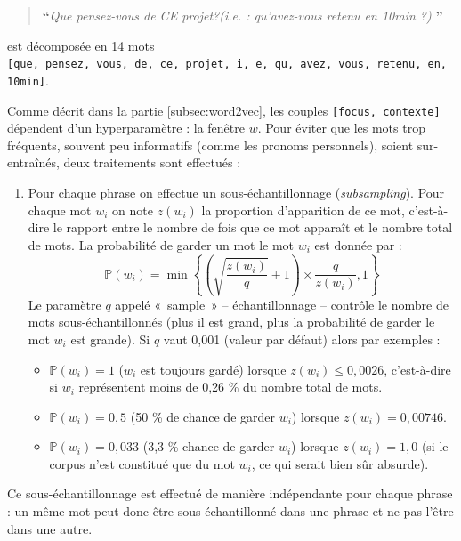 \documentclass[11pt,french,french]{article}
\providecommand{\tightlist}{%
  \setlength{\parskip}{0pt}
  }
\begin{document}
\begin{quote}
\LARGE \textbf{``}\normalsize \emph{Que pensez-vous de CE projet?(i.e. : qu'avez-vous retenu en 10min ?)} \LARGE \textbf{''}\normalsize
\end{quote}

est décomposée en 14 mots
\texttt{{[}que,\ pensez,\ vous,\ de,\ ce,\ projet,\ i,\ e,\ qu,\ avez,\ vous,\ retenu,\ en,\ 10min{]}}.

Comme décrit dans la partie \ref{subsec:word2vec}, les couples
\texttt{{[}focus,\ contexte{]}} dépendent d'un hyperparamètre : la
fenêtre \(w\). Pour éviter que les mots trop fréquents, souvent peu
informatifs (comme les pronoms personnels), soient sur-entraînés, deux
traitements sont effectués :

\begin{enumerate}
\def\labelenumi{\arabic{enumi}.}
\item
  Pour chaque phrase on effectue un sous-échantillonnage
  (\emph{subsampling}). Pour chaque mot \(w_i\) on note \(z(w_i)\) la
  proportion d'apparition de ce mot, c'est-à-dire le rapport entre le
  nombre de fois que ce mot apparaît et le nombre total de mots. La
  probabilité de garder un mot le mot \(w_i\) est donnée par : \[
  \mathbb P(w_i) = \min\left\{\left(\sqrt{\frac{z(w_i)}{q}} + 1 \right)
  \times
  \frac{q}{z(w_i)},1\right\}
  \] Le paramètre \(q\) appelé «~sample~» -- échantillonnage -- contrôle
  le nombre de mots sous-échantillonnés (plus il est grand, plus la
  probabilité de garder le mot \(w_i\) est grande). Si \(q\) vaut 0,001
  (valeur par défaut) alors par exemples :

  \begin{itemize}
  \tightlist
  \item
    \(\mathbb P(w_i) = 1\) (\(w_i\) est toujours gardé) lorsque
    \(z(w_i)\leq 0,0026\), c'est-à-dire si \(w_i\) représentent moins de
    0,26 \% du nombre total de mots.\\
  \item
    \(\mathbb P(w_i) = 0,5\) (50 \% de chance de garder \(w_i\)) lorsque
    \(z(w_i)=0,00746\).\\
  \item
    \(\mathbb P(w_i) = 0,033\) (3,3 \% chance de garder \(w_i\)) lorsque
    \(z(w_i)=1,0\) (si le corpus n'est constitué que du mot \(w_i\), ce
    qui serait bien sûr absurde).
  \end{itemize}
\end{enumerate}

Ce sous-échantillonnage est effectué de manière indépendante pour chaque
phrase : un même mot peut donc être sous-échantillonné dans une phrase
et ne pas l'être dans une autre.
\end{document}
